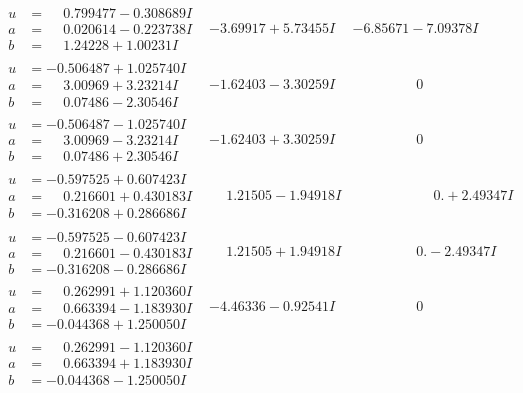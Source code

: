 \documentclass[1p]{elsarticle_modified}
\theoremstyle{definition}
\begin{document}
$$\begin{array}{c|c|c}
\begin{aligned}
u &= \phantom{-}0.799477 - 0.308689 I \\
a &= \phantom{-}0.020614 - 0.223738 I \\
b &= \phantom{-}1.24228 + 1.00231 I\end{aligned}
 & -3.69917 + 5.73455 I & -6.85671 - 7.09378 I \\ \hline\begin{aligned}
u &= -0.506487 + 1.025740 I \\
a &= \phantom{-}3.00969 + 3.23214 I \\
b &= \phantom{-}0.07486 - 2.30546 I\end{aligned}
 & -1.62403 - 3.30259 I & \phantom{-0.000000 } 0 \\ \hline\begin{aligned}
u &= -0.506487 - 1.025740 I \\
a &= \phantom{-}3.00969 - 3.23214 I \\
b &= \phantom{-}0.07486 + 2.30546 I\end{aligned}
 & -1.62403 + 3.30259 I & \phantom{-0.000000 } 0 \\ \hline\begin{aligned}
u &= -0.597525 + 0.607423 I \\
a &= \phantom{-}0.216601 + 0.430183 I \\
b &= -0.316208 + 0.286686 I\end{aligned}
 & \phantom{-}1.21505 - 1.94918 I & \phantom{-0.000000 -}0. + 2.49347 I \\ \hline\begin{aligned}
u &= -0.597525 - 0.607423 I \\
a &= \phantom{-}0.216601 - 0.430183 I \\
b &= -0.316208 - 0.286686 I\end{aligned}
 & \phantom{-}1.21505 + 1.94918 I & \phantom{-0.000000 } 0. - 2.49347 I \\ \hline\begin{aligned}
u &= \phantom{-}0.262991 + 1.120360 I \\
a &= \phantom{-}0.663394 - 1.183930 I \\
b &= -0.044368 + 1.250050 I\end{aligned}
 & -4.46336 - 0.92541 I & \phantom{-0.000000 } 0 \\ \hline\begin{aligned}
u &= \phantom{-}0.262991 - 1.120360 I \\
a &= \phantom{-}0.663394 + 1.183930 I \\
b &= -0.044368 - 1.250050 I\end{aligned}

\end{array}$$
\end{document}
